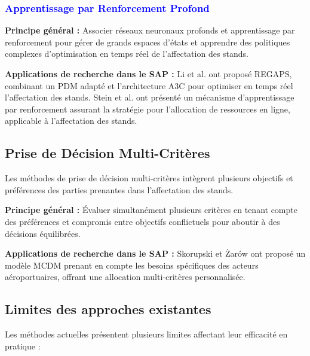 \vspace{-0.5em}
\subsubsection*{\small{\textcolor{blue}{Apprentissage par Renforcement Profond}}}
\vspace{-0.5em}

\textbf{Principe général :}  
Associer réseaux neuronaux profonds et apprentissage par renforcement pour gérer de grands espaces d’états et apprendre des politiques complexes d’optimisation en temps réel de l’affectation des stands.

\textbf{Applications de recherche dans le SAP :}  
Li et al. \cite{Li_2025} ont proposé REGAPS, combinant un PDM adapté et l’architecture A3C pour optimiser en temps réel l’affectation des stands. Stein et al. \cite{Stein_2020} ont présenté un mécanisme d’apprentissage par renforcement assurant la stratégie pour l’allocation de ressources en ligne, applicable à l’affectation des stands.

\vspace{-1em}
\subsection*{Prise de Décision Multi-Critères}

Les méthodes de prise de décision multi-critères intègrent plusieurs objectifs et préférences des parties prenantes dans l’affectation des stands.

\textbf{Principe général :}  
Évaluer simultanément plusieurs critères en tenant compte des préférences et compromis entre objectifs conflictuels pour aboutir à des décisions équilibrées.

\textbf{Applications de recherche dans le SAP :}  
Skorupski et Żarów \cite{Skorupski_2014} ont proposé un modèle \ac{MCDM} prenant en compte les besoins spécifiques des acteurs aéroportuaires, offrant une allocation multi-critères personnalisée.

\vspace{-0.7em}
\subsection{Limites des approches existantes}

Les méthodes actuelles présentent plusieurs limites affectant leur efficacité en pratique :

